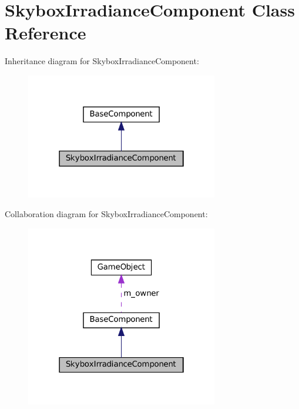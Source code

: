 \hypertarget{classSkyboxIrradianceComponent}{}\section{Skybox\+Irradiance\+Component Class Reference}
\label{classSkyboxIrradianceComponent}


Inheritance diagram for Skybox\+Irradiance\+Component\+:
\nopagebreak
\begin{figure}[H]
\begin{center}
\leavevmode
\includegraphics[width=238pt]{classSkyboxIrradianceComponent__inherit__graph}
\end{center}
\end{figure}


Collaboration diagram for Skybox\+Irradiance\+Component\+:
\nopagebreak
\begin{figure}[H]
\begin{center}
\leavevmode
\includegraphics[width=238pt]{classSkyboxIrradianceComponent__coll__graph}
\end{center}
\end{figure}
